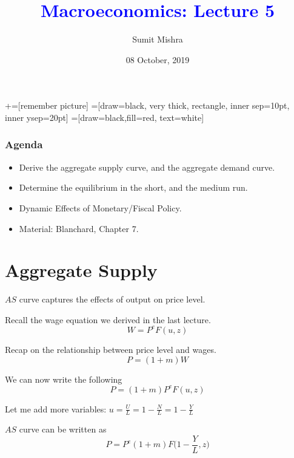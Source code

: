 \documentclass[shownotes,11pt, aspectratio=169]{beamer}
\title[]{\textcolor{blue}{Macroeconomics: Lecture 5}}
\author[SM]{Sumit Mishra}
\institute[IFMR]{\small{\begin{tabular}{c}
IFMR, Sri City \\
\end{tabular}}}
\date{08 October, 2019}
\newenvironment{wideitemize}{\itemize\addtolength{\itemsep}{10pt}}{\enditemize}
\begin{document}
\newcommand\marktopleft[1]{%
    \tikz[overlay,remember picture] 
        \node (marker-#1-a) at (-.3em,.3em) {};%
}
\newcommand\markbottomright[2]{%
    \tikz[overlay,remember picture] 
        \node (marker-#1-b) at (0em,0em) {};%
}
+=[remember picture] 
 =[draw=black, very thick, rectangle, inner sep=10pt, inner ysep=20pt]
 =[draw=black,fill=red, text=white]

\begin{frame}
\maketitle
\end{frame}

\begin{frame}
\frametitle{Agenda}
\begin{itemize}
\item Derive the aggregate supply curve, and the aggregate demand curve.
\item Determine the equilibrium in the short, and the medium run.
\item Dynamic Effects of Monetary/Fiscal Policy.
\item Material: Blanchard, Chapter 7.
\end{itemize}
\end{frame}

\section{Aggregate Supply}
\begin{frame}
\begin{wideitemize}
\item $AS$ curve captures the effects of output on price level.
\item Recall the wage equation we derived in the last lecture.
      \[ W = P^eF(u,z) \]
\item Recap on the relationship between price level and wages.
     \[ P = (1 + m)W \]
\item We can now write the following \pause
     \[ P = (1 + m)P^eF(u,z) \]
\pause
\item Let me add more variables: \pause $u = \frac{U}{L} = 1 - \frac{N}{L} = 1 - \frac{Y}{L}$
\pause
\item $AS$ curve can be written as 
      \[ P = P^e(1 + m)F\Bigg(1 - \frac{Y}{L}, z\Bigg) \]           
\end{wideitemize}
\end{frame}
\end{document}

